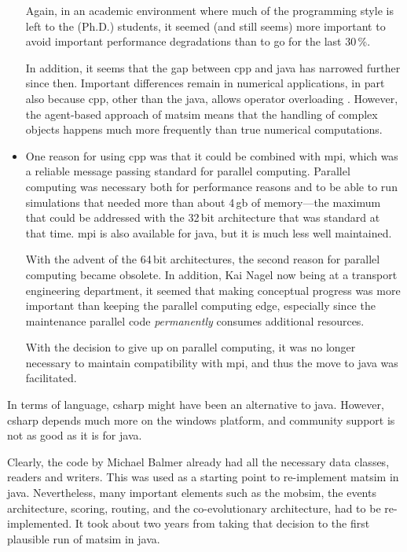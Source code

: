 \begin{itemize}
Again, in an academic environment where much of the programming style is left to the (Ph.D.) students, it seemed (and still seems) more important to avoid important performance degradations than to go for the last 30\,\%.


In addition, it seems that the gap between \gls{cpp} and \gls{java} has narrowed further since then.  Important differences remain in numerical applications, in part also because \gls{cpp}, other than the \gls{java}, allows operator overloading \citep{..}.  However, the agent-based approach of \gls{matsim} means that the handling of complex objects happens much more frequently than true numerical computations.

\item One reason for using \gls{cpp} was that it could be combined with \gls{mpi}, which was a reliable message passing standard for parallel computing.  Parallel computing was necessary both for performance reasons and to be able to run simulations that needed more than about 4\,\gls{gb} of memory---the maximum that could be addressed with the 32\,bit architecture that was standard at that time.  \gls{mpi} is also available for \gls{java}, but it is much less well maintained.

With the advent of the 64\,bit architectures, the second reason for parallel computing became obsolete. In addition, Kai Nagel now being at a transport engineering department, it seemed that making conceptual progress was more important than keeping the parallel computing edge, especially since the maintenance parallel code \emph{permanently} consumes additional resources.

With the decision to give up on parallel computing, it was no longer necessary to maintain compatibility with \gls{mpi}, and thus the move to \gls{java} was facilitated.

\end{itemize}
In terms of language, \gls{csharp} might have been an alternative to \gls{java}.  However, \gls{csharp} depends much more on the \gls{windows} platform, and community support is not as good as it is for \gls{java}.

Clearly, the code by Michael Balmer already had all the necessary data classes, readers and writers.  This was used as a starting point to re-implement \gls{matsim} in \gls{java}.  Nevertheless, many important elements such as the \gls{mobsim}, the events architecture, scoring, routing, and the co-evolutionary architecture, had to be re-implemented.  It took about two years from taking that decision to the first plausible run of \gls{matsim} in \gls{java}.

